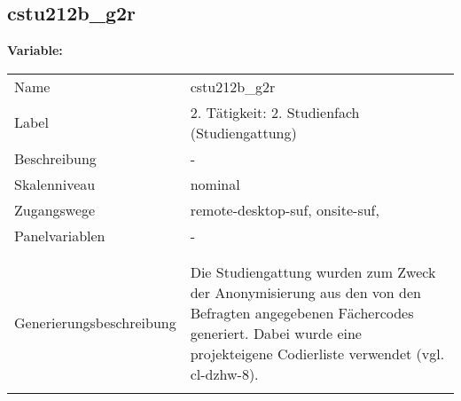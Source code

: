 	
	
	\subsection{cstu212b\_g2r}
	\label{subSection:cstu212b_g2r}

	\noindent\textbf{Variable:}\\
		\begin{tabular}{lL{11.3cm}}
			\label{tableVariable:cstu212b_g2r}
			Name & cstu212b\_g2r \\
			Label & 2. Tätigkeit: 2. Studienfach (Studiengattung) \\
			Beschreibung & - \\
			Skalenniveau & nominal \\
			Zugangswege &
				remote-desktop-suf,
				onsite-suf,
 \\
			Panelvariablen & -
			 \\
			 \\
 \\
					Generierungsbeschreibung & Die Studiengattung wurden zum Zweck der Anonymisierung aus den von den Befragten angegebenen Fächercodes generiert.  Dabei wurde eine projekteigene Codierliste verwendet (vgl. cl-dzhw-8).
				 \\	
			 \\
		\end{tabular}






